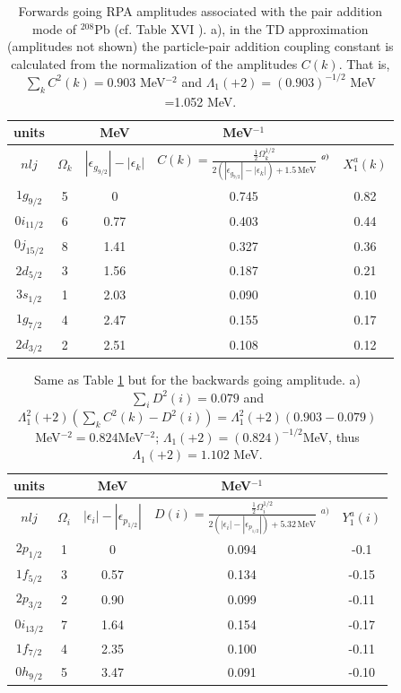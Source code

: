 \begin{table}
\begin{tabular}{|c|c|c|c|c|}
\hline units &  &MeV  &MeV$^{-1}$  &    \\ 
\hline  $nlj$&$\Omega_k$  &$|\epsilon_{g_{9/2}}|-|\epsilon_k|$  &$C(k)=\frac{\frac{1}{2}\Omega_k^{1/2}}{2(|\epsilon_{g_{9/2}}|-|\epsilon_k|)+1.5\,\text{MeV}}$  $\vphantom{\prod}^{a)}$& $X_1^a(k)$  \\ 
\hline  $1g_{9/2}$& 5 &  0& 0.745 &  0.82\\ 
\hline $0i_{11/2}$ & 6 &  0.77&0.403  & 0.44  \\ 
\hline  $0j_{15/2}$& 8 &  1.41&  0.327&  0.36\\ 
\hline  $2d_{5/2}$& 3 & 1.56 & 0.187 & 0.21 \\ 
\hline  $3s_{1/2}$&  1& 2.03 &  0.090& 0.10\\ 
\hline  $1g_{7/2}$&  4& 2.47 & 0.155 &  0.17  \\ 
\hline  $2d_{3/2}$&  2& 2.51 & 0.108 &  0.12 \\ 
\hline 
\end{tabular}\caption{ Forwards going RPA amplitudes associated with the pair addition mode of $^{208}$Pb (cf.  Table XVI \cite{Broglia:73}). a), in the TD approximation (amplitudes not shown) the particle-pair addition coupling constant is calculated from the normalization of the amplitudes $C(k)$. That is,  $\sum_{k}C^2(k)=0.903$ MeV$^{-2}$ and $\Lambda_1(+2)=(0.903)^{-1/2}$ MeV =1.052 MeV.}\label{tab1E4}
\end{table}
\begin{table}
\begin{tabular}{|c|c|c|c|c|}
\hline units &  &MeV  &MeV$^{-1}$  &    \\ 
\hline  $nlj$&$\Omega_i$  &$|\epsilon_i|-|\epsilon_{p_{1/2}}|$  &$D(i)=\frac{\frac{1}{2}\Omega_i^{1/2}}{2(|\epsilon_i|-|\epsilon_{p_{1/2}}|)+5.32\,\text{MeV}}$ $^{a)}$ & $Y_1^a(i)$  \\ 
\hline  $2p_{1/2}$& 1 &  0& 0.094 &  -0.1\\ 
\hline $1f_{5/2}$ & 3 &  0.57& 0.134  & -0.15 \\ 
\hline  $2p_{3/2}$& 2 &  0.90&  0.099&  -0.11\\ 
\hline  $0i_{13/2}$& 7 & 1.64 & 0.154 & -0.17 \\ 
\hline  $1f_{7/2}$&  4& 2.35 &  0.100& -0.11 \\ 
\hline  $0h_{9/2}$&  5& 3.47 & 0.091 &  -0.10  \\ 
\hline 
\end{tabular}\caption{ Same as Table \ref{tab1E4} but for the backwards going amplitude. a) $\sum_i D^2(i)=0.079$ and $\Lambda_1^2(+2) (\sum_k C^2(k)-D^2(i))=\Lambda_1^2(+2) (0.903-0.079)$ MeV$^{-2}=0.824$MeV$^{-2}$; $\Lambda_1(+2)=(0.824)^{-1/2}$MeV, thus $\Lambda_1(+2)=1.102$ MeV.}\label{tab1E5}
\end{table}

